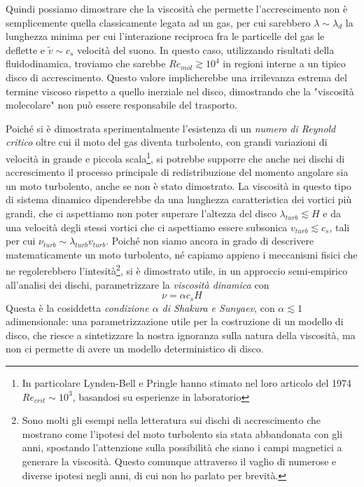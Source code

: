 \documentclass[a4paperbi]{article}
\begin{document}
	Quindi possiamo dimostrare che la viscosità che permette l'accrescimento non è semplicemente quella classicamente legata ad un gas, per cui sarebbero $\lambda\sim\lambda_d$ la lunghezza minima per cui l'interazione reciproca fra le particelle del gas le deflette e $\tilde{v}\sim c_s$ velocità del suono. In questo caso, utilizzando risultati della fluidodinamica, troviamo che sarebbe $Re_{mol}\gtrsim10^4$ in regioni interne a un tipico disco di accrescimento. Questo valore implicherebbe una irrilevanza estrema del termine viscoso rispetto a quello inerziale nel disco, dimostrando che la "viscosità molecolare" non può essere responsabile del trasporto.
	
	Poiché si è dimostrata sperimentalmente l'esistenza di un \textit{numero di Reynold critico} oltre cui il moto del gas diventa turbolento, con grandi variazioni di velocità in grande e piccola scala\footnote{In particolare Lynden-Bell e Pringle hanno stimato nel loro articolo del 1974 $Re_{crit}\sim 10^3$, basandosi su esperienze in laboratorio}, si potrebbe supporre che anche nei dischi di accrescimento il processo principale di redistribuzione del momento angolare sia un moto turbolento, anche se non è stato dimostrato.
	La viscosità in questo tipo di sistema dinamico dipenderebbe da una lunghezza caratteristica dei vortici più grandi, che ci aspettiamo non poter superare l'altezza del disco $\lambda_{turb}\lesssim H$ e da una velocità degli stessi vortici che ci aspettiamo essere subsonica $v_{turb}\lesssim c_s$, tali per cui $\nu_{turb}\sim \lambda_{turb}v_{turb}$.
	Poiché non siamo ancora in grado di descrivere matematicamente un moto turbolento, né capiamo appieno i meccanismi fisici che ne regolerebbero l'intesità\footnote{Sono molti gli esempi nella letteratura sui dischi di accrescimento che mostrano come l'ipotesi del moto turbolento sia stata abbandonata con gli anni, spostando l'attenzione sulla possibilità che siano i campi magnetici a generare la viscosità. Questo comunque attraverso il vaglio di numerose e diverse ipotesi negli anni, di cui non ho parlato per brevità.}, si è dimostrato utile, in un approccio semi-empirico all'analisi dei dischi, parametrizzare la \textit{viscosità dinamica} con
	\begin{equation}
		\nu=\alpha c_s H
	\end{equation}
	Questa è la cosiddetta \textit{condizione $\alpha$ di Shakura e Sunyaev}, con $\alpha\lesssim 1$ adimensionale: una parametrizzazione utile per la costruzione di un modello di disco, che riesce a sintetizzare la nostra ignoranza sulla natura della viscosità, ma non ci permette di avere un modello deterministico di disco.
\end{document}
